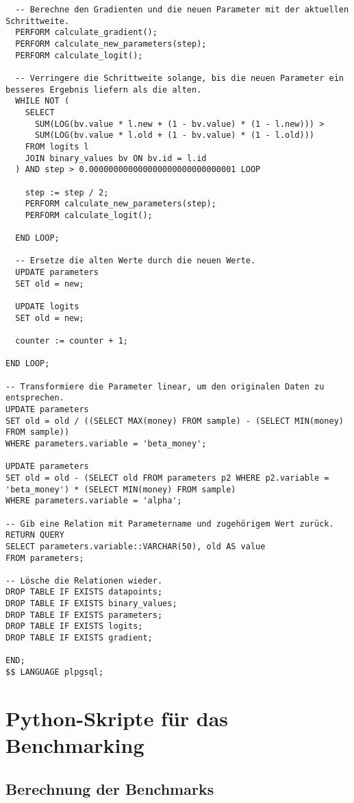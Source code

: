 \begin{verbatim}
  -- Berechne den Gradienten und die neuen Parameter mit der aktuellen Schrittweite.
  PERFORM calculate_gradient();
  PERFORM calculate_new_parameters(step);
  PERFORM calculate_logit();

  -- Verringere die Schrittweite solange, bis die neuen Parameter ein besseres Ergebnis liefern als die alten.
  WHILE NOT (
    SELECT
      SUM(LOG(bv.value * l.new + (1 - bv.value) * (1 - l.new))) >
      SUM(LOG(bv.value * l.old + (1 - bv.value) * (1 - l.old)))
    FROM logits l
    JOIN binary_values bv ON bv.id = l.id
  ) AND step > 0.000000000000000000000000000001 LOOP

    step := step / 2;
    PERFORM calculate_new_parameters(step);
    PERFORM calculate_logit();

  END LOOP;

  -- Ersetze die alten Werte durch die neuen Werte.
  UPDATE parameters
  SET old = new;

  UPDATE logits
  SET old = new;

  counter := counter + 1;

END LOOP;

-- Transformiere die Parameter linear, um den originalen Daten zu entsprechen.
UPDATE parameters
SET old = old / ((SELECT MAX(money) FROM sample) - (SELECT MIN(money) FROM sample))
WHERE parameters.variable = 'beta_money';

UPDATE parameters
SET old = old - (SELECT old FROM parameters p2 WHERE p2.variable = 'beta_money') * (SELECT MIN(money) FROM sample)
WHERE parameters.variable = 'alpha';

-- Gib eine Relation mit Parametername und zugehörigem Wert zurück.
RETURN QUERY
SELECT parameters.variable::VARCHAR(50), old AS value
FROM parameters;

-- Lösche die Relationen wieder.
DROP TABLE IF EXISTS datapoints;
DROP TABLE IF EXISTS binary_values;
DROP TABLE IF EXISTS parameters;
DROP TABLE IF EXISTS logits;
DROP TABLE IF EXISTS gradient;

END;
$$ LANGUAGE plpgsql;
\end{verbatim}

\chapter{Python-Skripte für das Benchmarking}
\label{appendix:F}

\section{Berechnung der Benchmarks}
\label{appendix:F:1}

